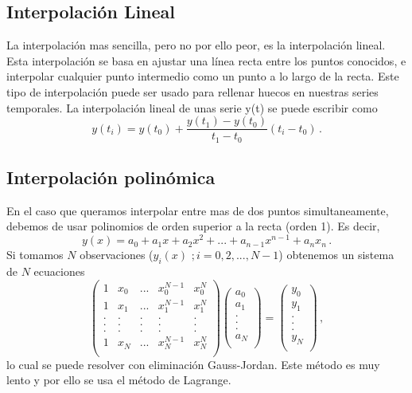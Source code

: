 \documentclass[
]{agujournal2019}
\begin{document}
\subsection{Interpolación Lineal}

La interpolación mas sencilla, pero no por ello peor, es la
interpolación lineal. Esta interpolación se basa en ajustar una línea
recta entre los puntos conocidos, e interpolar cualquier punto
intermedio como un punto a lo largo de la recta. Este tipo de
interpolación puede ser usado para rellenar huecos en nuestras series
temporales. La interpolación lineal de unas serie y(t) se puede escribir
como \[y(t_i)=y(t_0)+\frac{y(t_1)-y(t_0)}{t_1 - t_0}(t_i-t_0)\,.\]

\subsection{Interpolación polinómica}

En el caso que queramos interpolar entre mas de dos puntos
simultaneamente, debemos de usar polinomios de orden superior a la recta
(orden 1). Es decir,
\[y(x)=a_0 + a_1 x + a_2 x^2 + ... + a_{n-1}x^{n-1} + a_n x_n\,.\] Si
tomamos \(N\) observaciones (\(y_i(x)\,\,;i=0,2,...,N-1\)) obtenemos un
sistema de \(N\) ecuaciones \[\left(\begin{array}{ccccc}
  1 & x_0 & ... & x_0^{N-1} & x_0^N\\
  1 & x_1 & ... & x_1^{N-1} & x_1^N\\
  . & . & . & . & .\\
  . & . & . & . & .\\
  . & . & . & . & .\\
  1 & x_N & ... & x_N^{N-1} & x_N^N\\
     \end{array}\right)
    \left(\begin{array}{c}
  a_0 \\
  a_1 \\
  . \\
  . \\
  . \\
  a_N \\
     \end{array}\right)=
     \left(\begin{array}{c}
  y_0 \\
  y_1 \\
  . \\
  . \\
  . \\
  y_N \\
     \end{array}\right)\,,\] lo cual se puede resolver con eliminación
Gauss-Jordan. Este método es muy lento y por ello se usa el método de
Lagrange.
\end{document}

